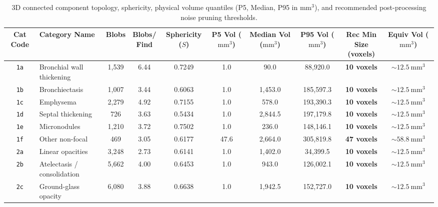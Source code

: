 \documentclass[11pt,a4paper]{article}
\begin{document}
\begin{table}[htbp]
\centering
\caption{3D connected component topology, sphericity, physical volume quantiles (P5, Median, P95 in $\text{mm}^3$), and recommended post-processing noise pruning thresholds.}
\label{tab:morphology_stats}
\scriptsize
\setlength{\tabcolsep}{2.2pt}
\begin{tabularx}{\linewidth}{c >{\raggedright\arraybackslash}X c c c c c c c c}
\toprule
\textbf{Cat Code} & \textbf{Category Name} & \textbf{Blobs} & \makecell{\textbf{Blobs/}\\\textbf{Find}} & \makecell{\textbf{Sphericity}\\\textbf{($S$)}} & \makecell{\textbf{P5 Vol}\\\textbf{($\text{mm}^3$)}} & \makecell{\textbf{Median Vol}\\\textbf{($\text{mm}^3$)}} & \makecell{\textbf{P95 Vol}\\\textbf{($\text{mm}^3$)}} & \makecell{\textbf{Rec Min Size}\\\textbf{(voxels)}} & \makecell{\textbf{Equiv Vol}\\\textbf{($\text{mm}^3$)}} \\
\midrule
\texttt{1a} & Bronchial wall thickening & 1,539 & 6.44 & 0.7249 & 1.0 & 90.0 & 88,920.0 & \textbf{10 voxels} & $\sim 12.5~\text{mm}^3$ \\
\texttt{1b} & Bronchiectasis & 1,007 & 3.44 & 0.6063 & 1.0 & 1,453.0 & 185,597.3 & \textbf{10 voxels} & $\sim 12.5~\text{mm}^3$ \\
\texttt{1c} & Emphysema & 2,279 & 4.92 & 0.7155 & 1.0 & 578.0 & 193,390.3 & \textbf{10 voxels} & $\sim 12.5~\text{mm}^3$ \\
\texttt{1d} & Septal thickening & 726 & 3.63 & 0.5434 & 1.0 & 2,844.5 & 197,179.8 & \textbf{10 voxels} & $\sim 12.5~\text{mm}^3$ \\
\texttt{1e} & Micronodules & 1,210 & 3.72 & 0.7502 & 1.0 & 236.0 & 148,146.1 & \textbf{10 voxels} & $\sim 12.5~\text{mm}^3$ \\
\texttt{1f} & Other non-focal & 469 & 3.05 & 0.6177 & 47.6 & 2,664.0 & 305,819.8 & \textbf{47 voxels} & $\sim 58.8~\text{mm}^3$ \\
\texttt{2a} & Linear opacities & 3,248 & 2.73 & 0.6141 & 1.0 & 1,402.0 & 34,399.5 & \textbf{10 voxels} & $\sim 12.5~\text{mm}^3$ \\
\texttt{2b} & Atelectasis / consolidation & 5,662 & 4.00 & 0.6453 & 1.0 & 943.0 & 126,002.1 & \textbf{10 voxels} & $\sim 12.5~\text{mm}^3$ \\
\texttt{2c} & Ground-glass opacity & 6,080 & 3.88 & 0.6638 & 1.0 & 1,942.5 & 152,727.0 & \textbf{10 voxels} & $\sim 12.5~\text{mm}^3$ \\

\end{tabularx}
\end{table}
\end{document}

